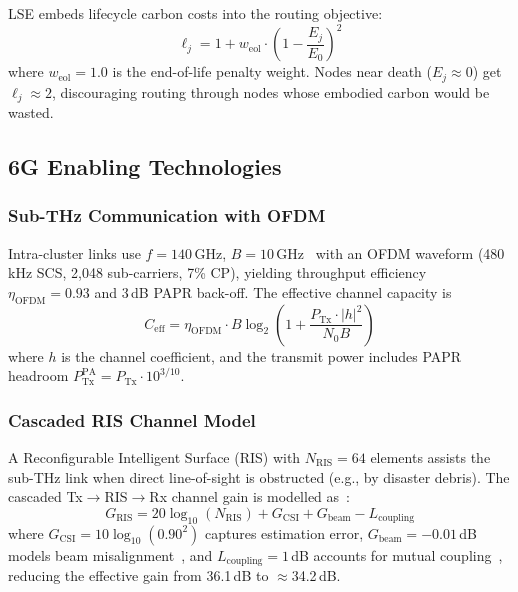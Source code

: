 \documentclass[12pt, onecolumn, journal]{IEEEtran}
\begin{document}
LSE embeds lifecycle carbon costs into the routing objective:
\begin{equation}
    \ell_j = 1 + w_{\text{eol}} \cdot \left(1 - \frac{E_j}{E_0}\right)^2
    \label{eq:lifecycle_penalty}
\end{equation}
where $w_{\text{eol}} = 1.0$ is the end-of-life penalty weight.
Nodes near death ($E_j \approx 0$) get $\ell_j \approx 2$, discouraging routing through nodes whose embodied carbon would be wasted.

\subsection{6G Enabling Technologies}
\label{sec:6g_enabling}

\subsubsection{Sub-THz Communication with OFDM}
\label{sec:thz}

Intra-cluster links use $f{=}140$\,GHz, $B{=}10$\,GHz~\cite{rappaport2019thz} with an OFDM waveform (480\,kHz SCS, 2{,}048 sub-carriers, 7\% CP), yielding throughput efficiency $\eta_{\text{OFDM}}{=}0.93$ and 3\,dB PAPR back-off.
The effective channel capacity is
\begin{equation}
    C_{\text{eff}} = \eta_{\text{OFDM}} \cdot B \log_2\!\left(1 + \frac{P_{\text{Tx}} \cdot |h|^2}{N_0 B}\right)
    \label{eq:thz_capacity}
\end{equation}
where $h$ is the channel coefficient, and the transmit power includes PAPR headroom $P_{\text{Tx}}^{\text{PA}} = P_{\text{Tx}} \cdot 10^{3/10}$.

\subsubsection{Cascaded RIS Channel Model}
\label{sec:ris}

A Reconfigurable Intelligent Surface (RIS) with $N_{\text{RIS}} = 64$ elements assists the sub-THz link when direct line-of-sight is obstructed (e.g., by disaster debris).
The cascaded Tx$\to$RIS$\to$Rx channel gain is modelled as~\cite{huang2021ris, huang2020ris_drl, alhilo2024ris_uav}:
\begin{equation}
    G_{\text{RIS}} = 20\log_{10}(N_{\text{RIS}}) + G_{\text{CSI}} + G_{\text{beam}} - L_{\text{coupling}}
    \label{eq:ris_gain}
\end{equation}
where $G_{\text{CSI}}{=}10\log_{10}(0.90^2)$ captures estimation error, $G_{\text{beam}}{=}{-}0.01$\,dB models beam misalignment~\cite{alhilo2024ris_uav}, and $L_{\text{coupling}}{=}1$\,dB accounts for mutual coupling~\cite{yang2021ris_jamming}, reducing the effective gain from 36.1\,dB to $\approx$34.2\,dB.
\end{document}
